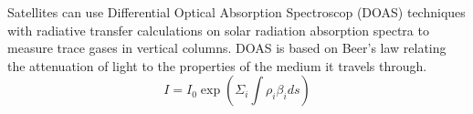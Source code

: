 
Satellites can use  Differential Optical Absorption Spectroscop (DOAS) techniques with radiative transfer calculations on solar radiation absorption spectra to measure trace gases in vertical columns.
DOAS is based on Beer's law relating the attenuation of light to the properties of the medium it travels through. 
$$ I = I_0 \exp \left( \Sigma_i \int \rho_i \beta_i ds \right) $$
